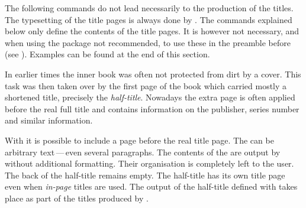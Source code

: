 The following commands do not lead necessarily to the production of the
titles. The typesetting of the title pages is always done by
. The commands explained below only define the contents of
the title pages. It is however not necessary, and when using the
 package not recommended, to use these in
the preamble before  (see
\cite{package:babel}). Examples can be found at the end of this section.

\begin{Explain}%
\begin{Declaration}
\end{Declaration}%
%
  In earlier times the inner book was often not protected from dirt by a cover.
  This task was then taken over by the first page of the book which
  carried mostly a shortened title, precisely the \emph{half-title}.
  Nowadays the extra page is often applied before the real full title
  and contains information on the publisher, series number and similar
  information.
\end{Explain}

With {\KOMAScript} it is possible to include a page before the real
title page.  The  can be arbitrary text\,---\,even
several paragraphs. The contents of the  are output
by {\KOMAScript} without additional formatting. Their organisation is
completely left to the user. The back of the half-title remains empty.
The half-title has its own title page even when \emph{in-page} titles
are used. The output of the half-title defined with 
takes place as part of the titles produced by .


